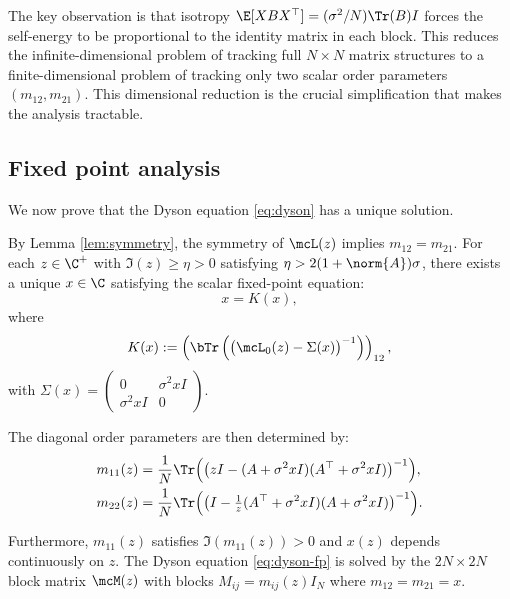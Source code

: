 \begin{remark}
The key observation is that isotropy $\E[XBX^\top] = (\sigma^2/N)\Tr(B)I$ forces the self-energy to be proportional to the identity matrix in each block. This reduces the infinite-dimensional problem of tracking full $N \times N$ matrix structures to a finite-dimensional problem of tracking only two scalar order parameters $(m_{12}, m_{21})$. This dimensional reduction is the crucial simplification that makes the analysis tractable.
\end{remark}

\subsection{Fixed point analysis}

We now prove that the Dyson equation \eqref{eq:dyson} has a unique solution.

\begin{proposition}\label{prop:fixed-point}
By Lemma \ref{lem:symmetry}, the symmetry of $\mcL(z)$ implies $m_{12} = m_{21}$.
For each $z \in \C^+$ with $\Im(z) \geq \eta > 0$ satisfying $\eta > 2(1 + \norm{A})\sigma$, there exists a unique $x \in \C$ satisfying the scalar fixed-point equation:
\begin{equation}\label{eq:scalar-fp}
x = K(x),
\end{equation}
where
\begin{equation}\label{eq:K-operator}
K(x) := \left(\bTr\left(\bigl(\mcL_0(z) - \Sigma(x)\bigr)^{-1}\right)\right)_{12},
\end{equation}
with $\Sigma(x) = \begin{pmatrix} 0 & \sigma^2 x I \\ \sigma^2 x I & 0 \end{pmatrix}$.

The diagonal order parameters are then determined by:
\begin{align}
m_{11}(z) &= \frac{1}{N}\Tr\Bigl(\bigl(zI - (A + \sigma^2 x I)(A^\top + \sigma^2 x I)\bigr)^{-1}\Bigr), \label{eq:m11-from-x}\\
m_{22}(z) &= \frac{1}{N}\Tr\Bigl(\bigl(I - \tfrac{1}{z}(A^\top + \sigma^2 x I)(A + \sigma^2 x I)\bigr)^{-1}\Bigr). \label{eq:m22-from-x}
\end{align}

Furthermore, $m_{11}(z)$ satisfies $\Im(m_{11}(z)) > 0$ and $x(z)$ depends continuously on $z$. The Dyson equation \eqref{eq:dyson-fp} is solved by the $2N \times 2N$ block matrix $\mcM(z)$ with blocks $M_{ij} = m_{ij}(z) I_N$ where $m_{12} = m_{21} = x$.
\end{proposition}

